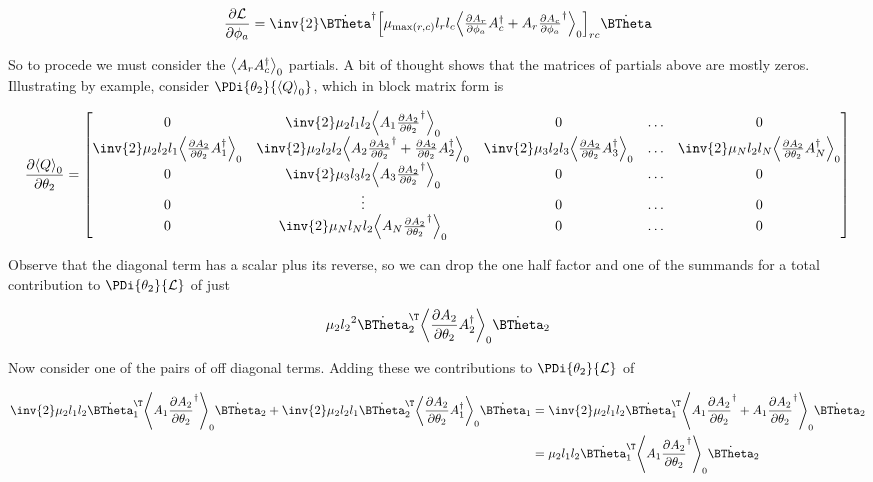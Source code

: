 \begin{align}\label{eqn:multiPendulumSpherical2:boo6c}
\PD{\phi_a}{\LL}
=
\inv{2} \dot{\BTheta}^\dagger
{\begin{bmatrix}
\mu_{\max(r,c)} l_r l_c \gpgradezero{
\PD{\phi_a}{A_r} A_c^\dagger
+A_r \PD{\phi_a}{A_c}^\dagger
}
\end{bmatrix}}_{rc} 
\dot{\BTheta}
\end{align}

So to procede we must consider the ${\left\langle{{A_r A_c^\dagger}}\right\rangle}_{0}$ partials.  A bit of thought shows that the matrices of partials above are mostly zeros.  Illustrating by example, consider $\PDi{\theta_2}{\gpgradezero{Q}}$, which in block matrix form is

\begin{align}\label{eqn:multiPendulumSpherical2:boo33}
\PD{\theta_2}{\gpgradezero{Q}}
=
\begin{bmatrix}
0 & \inv{2} \mu_2 l_1 l_2 \gpgradezero{A_1 \PD{\theta_2}{A_2}^\dagger} & 0 & \hdots & 0 \\
\inv{2} \mu_2 l_2 l_1 \gpgradezero{\PD{\theta_2}{A_2} A_1^\dagger} &
\inv{2} \mu_2 l_2 l_2 \gpgradezero{A_2 \PD{\theta_2}{A_2}^\dagger + \PD{\theta_2}{A_2} A_2^\dagger} &
\inv{2} \mu_3 l_2 l_3 \gpgradezero{\PD{\theta_2}{A_2} A_3^\dagger} & \hdots &
\inv{2} \mu_N l_2 l_N \gpgradezero{\PD{\theta_2}{A_2} A_N^\dagger} \\
0 & \inv{2} \mu_3 l_3 l_2 \gpgradezero{A_3 \PD{\theta_2}{A_2}^\dagger} & 0 & \hdots & 0 \\
0 & \vdots & 0 & \hdots & 0 \\
0 & \inv{2} \mu_N l_N l_2 \gpgradezero{A_N \PD{\theta_2}{A_2}^\dagger} & 0 & \hdots & 0 \\
\end{bmatrix}
\end{align}

Observe that the diagonal term has a scalar plus its reverse, so we can drop the one half factor and one of the summands for a total contribution to $\PDi{\theta_2}{\LL}$ of just

\begin{align*}
\mu_2 {l_2}^2 {\dot{\BTheta}_2}^\T \gpgradezero{\PD{\theta_2}{A_2} A_2^\dagger} \dot{\BTheta}_2
\end{align*}

Now consider one of the pairs of off diagonal terms.  Adding these we contributions to $\PDi{\theta_2}{\LL}$ of

\begin{align*}
\inv{2} \mu_2 l_1 l_2 
{\dot{\BTheta}_1}^\T
\gpgradezero{A_1 \PD{\theta_2}{A_2}^\dagger} 
\dot{\BTheta}_2
+\inv{2} \mu_2 l_2 l_1 
{\dot{\BTheta}_2}^\T
\gpgradezero{\PD{\theta_2}{A_2} A_1^\dagger} 
\dot{\BTheta}_1
&=
\inv{2} \mu_2 l_1 l_2 
{\dot{\BTheta}_1}^\T
\gpgradezero{
A_1 \PD{\theta_2}{A_2}^\dagger
+A_1 \PD{\theta_2}{A_2}^\dagger
} 
\dot{\BTheta}_2 \\
&=
\mu_2 l_1 l_2 
{\dot{\BTheta}_1}^\T
\gpgradezero{
A_1 \PD{\theta_2}{A_2}^\dagger
} 
\dot{\BTheta}_2 \\
\end{align*}

